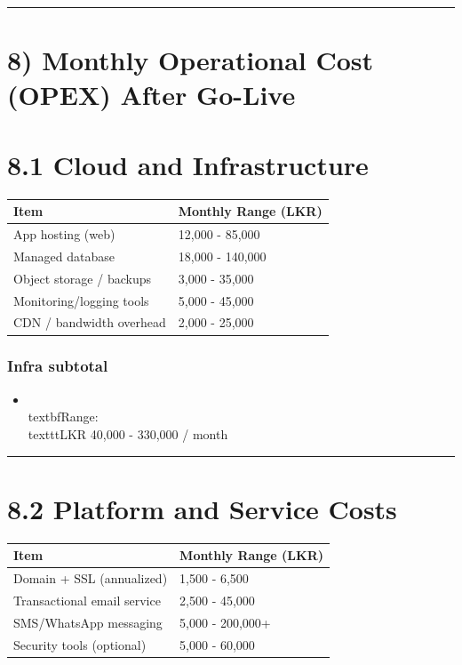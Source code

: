 \documentclass[11pt,a4paper]{article}
\begin{document}
\bigskip\hrule\bigskip

\section{8) Monthly Operational Cost (OPEX) After Go-Live}

\section{8.1 Cloud and Infrastructure}

\begin{longtable}{p{} | p{}}
\toprule
Item & Monthly Range (LKR) \\
\midrule
App hosting (web) & 12,000 - 85,000 \\
Managed database & 18,000 - 140,000 \\
Object storage / backups & 3,000 - 35,000 \\
Monitoring/logging tools & 5,000 - 45,000 \\
CDN / bandwidth overhead & 2,000 - 25,000 \\
\bottomrule
\end{longtable}

\subsubsection{Infra subtotal}

\begin{itemize}
\item \\textbf{Range:} \\texttt{LKR 40,000 - 330,000 / month}
\end{itemize}

\bigskip\hrule\bigskip

\section{8.2 Platform and Service Costs}

\begin{longtable}{p{} | p{}}
\toprule
Item & Monthly Range (LKR) \\
\midrule
Domain + SSL (annualized) & 1,500 - 6,500 \\
Transactional email service & 2,500 - 45,000 \\
SMS/WhatsApp messaging & 5,000 - 200,000+ \\
Security tools (optional) & 5,000 - 60,000 \\
\bottomrule
\end{longtable}
\end{document}
